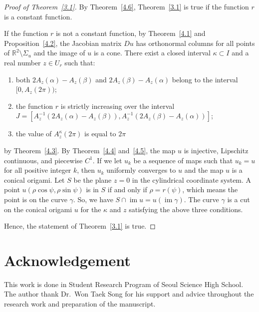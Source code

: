\documentclass{amsart}
\theoremstyle{plain}
\theoremstyle{definition}
\theoremstyle{remark}
\DeclareMathOperator{\im}{im}
\begin{document}
\begin{proof}[Proof of Theorem~\ref{3.1}]%
By Theorem~\ref{4.6}, Theorem~\ref{3.1} is true if the function $r$ is a constant function.

If the function $r$ is not a constant function,
by Theorem~\ref{4.1} and Proposition~\ref{4.2}, the Jacobian matrix $Du$ has orthonormal columns for all points of $\mathbb{R}^2\setminus\Sigma_u$ and the image of $u$ is a cone.
There exist a closed interval $\kappa\subset I$ and a real number $z\in U_r$ such that:
\begin{enumerate}
\item both $2A_z(\alpha)-A_z(\beta)$ and $2A_z(\beta)-A_z(\alpha)$ belong to the interval $[0,A_z(2\pi))$;
\item the function $r$ is strictly increasing over the interval $J=[A_z^{-1}(2A_z(\alpha)-A_z(\beta)),A_z^{-1}(2A_z(\beta)-A_z(\alpha))]$;
\item the value of $A_z^{\kappa}(2\pi)$ is equal to $2\pi$
\end{enumerate}
by Theorem~\ref{4.3}.
By Theorem~\ref{4.4} and~\ref{4.5}, the map $u$ is injective, Lipschitz continuous, and piecewise $C^1$.
If we let $u_k$ be a sequence of maps such that $u_k=u$ for all positive integer $k$, then $u_k$ uniformly converges to $u$ and the map $u$ is a conical origami.
Let $S$ be the plane $z=0$ in the cylindrical coordinate system.
A point $u(\rho\cos\psi,\rho\sin\psi)$ is in $S$ if and only if $\rho=r(\psi)$, which means the point is on the curve $\gamma$.
So, we have $S\cap\im u=u(\im\gamma)$.
The curve $\gamma$ is a cut on the conical origami $u$ for the $\kappa$ and $z$ satisfying the above three conditions.

Hence, the statement of Theorem~\ref{3.1} is true.
\end{proof}

\section*{Acknowledgement}
This work is done in Student Research Program of Seoul Science High School. 
The author thank Dr.~Won Taek Song for his support and advice 
throughout the research work and preparation of the manuscript. 




\end{document}
